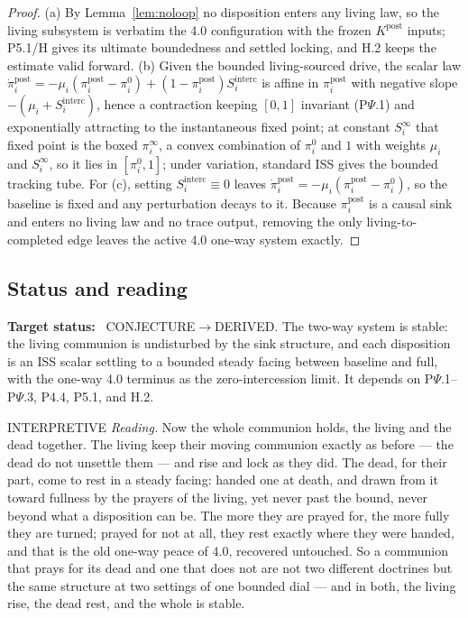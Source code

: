 \documentclass[11pt,a4paper]{article}
\newcommand{\stDerived}{\textcolor{cDer}{\textsf{\small DERIVED}}}
\newcommand{\stInterp}{\textcolor{cInt}{\textsf{\small INTERPRETIVE}}}
\newcommand{\stConj}{\textcolor{cCon}{\textsf{\small CONJECTURE}}}
\theoremstyle{definition}
\theoremstyle{plain}
\theoremstyle{remark}
\begin{document}
\begin{proof}
(a) By Lemma~\ref{lem:noloop} no disposition enters any living law, so the living subsystem is
verbatim the 4.0 configuration with the frozen \(K^{\mathrm{post}}\) inputs; P5.1/H gives its
ultimate boundedness and settled locking, and H.2 keeps the estimate valid forward. (b) Given
the bounded living-sourced drive, the scalar law
\(\dot\pi_i^{\mathrm{post}}=-\mu_i(\pi_i^{\mathrm{post}}-\pi_i^{0})+(1-\pi_i^{\mathrm{post}})S_i^{\mathrm{interc}}\)
is affine in \(\pi_i^{\mathrm{post}}\) with negative slope \(-(\mu_i+S_i^{\mathrm{interc}})\),
hence a contraction keeping \([0,1]\) invariant (P$\Psi$.1) and exponentially attracting to the
instantaneous fixed point; at constant \(S_i^{\infty}\) that fixed point is the boxed
\(\pi_i^{\infty}\), a convex combination of \(\pi_i^{0}\) and \(1\) with weights \(\mu_i\) and
\(S_i^{\infty}\), so it lies in \([\pi_i^{0},1]\); under variation, standard ISS gives the
bounded tracking tube. For (c), setting \(S_i^{\mathrm{interc}}\equiv0\) leaves
\(\dot\pi_i^{\mathrm{post}}=-\mu_i(\pi_i^{\mathrm{post}}-\pi_i^0)\), so the baseline is
fixed and any perturbation decays to it. Because \(\pi_i^{\mathrm{post}}\) is a causal sink
and enters no living law and no trace output, removing the only living-to-completed edge leaves
the active 4.0 one-way system exactly. \qedhere
\end{proof}

\subsection{Status and reading}

\textbf{Target status:}~
\stConj\(\to\)\stDerived. The two-way system is stable: the living communion is undisturbed by
the sink structure, and each disposition is an ISS scalar settling to a bounded steady facing
between baseline and full, with the one-way 4.0 terminus as the zero-intercession limit. It
depends on P$\Psi$.1--P$\Psi$.3, P4.4, P5.1, and H.2.

\medskip
\stInterp\quad
\emph{Reading.}
Now the whole communion holds, the living and the dead together. The living keep their moving
communion exactly as before --- the dead do not unsettle them --- and rise and lock as they
did. The dead, for their part, come to rest in a steady facing: handed one at death, and drawn
from it toward fullness by the prayers of the living, yet never past the bound, never beyond
what a disposition can be. The more they are prayed for, the more fully they are turned; prayed
for not at all, they rest exactly where they were handed, and that is the old one-way peace of
4.0, recovered untouched. So a communion that prays for its dead and one that does not are not
two different doctrines but the same structure at two settings of one bounded dial --- and in
both, the living rise, the dead rest, and the whole is stable.
\end{document}
